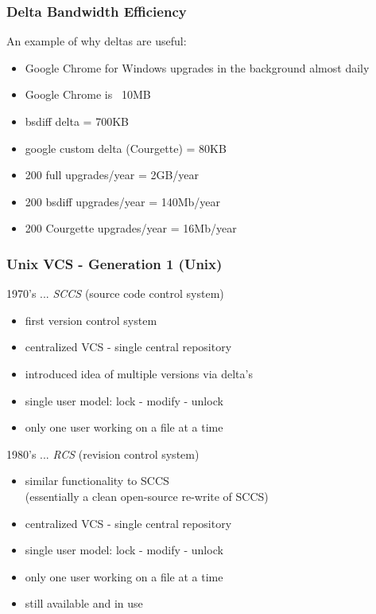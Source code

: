 \begin{frame}
\frametitle{Delta Bandwidth Efficiency}
An example of why deltas are useful:
{\small 
\begin{itemize}
\item  Google Chrome for Windows upgrades in the background almost daily
\item  Google Chrome is ~10MB
\item  bsdiff delta = 700KB
\item  google custom delta (Courgette) = 80KB
\item  200 full upgrades/year = 2GB/year
\item  200 bsdiff upgrades/year = 140Mb/year
\item  200 Courgette upgrades/year = 16Mb/year
\end{itemize}
}
\end{frame}

\begin{frame}
\frametitle{Unix VCS - Generation 1 (Unix)}
1970's ... {\em{SCCS}} (source code control system)
\begin{itemize}
\item  first version control system
\item  centralized VCS - single central repository
\item  introduced idea of multiple versions via delta's
\item  single user model: lock - modify - unlock
\item  only one user working on a file at a time 
\end{itemize}

1980's ... {\em{RCS}} (revision control system)
\begin{itemize}
\item  similar functionality to SCCS \\
    {\small (essentially a clean open-source re-write of SCCS)}
\item  centralized VCS - single central repository
\item  single user model: lock - modify - unlock
\item  only one user working on a file at a time 
\item  still available and in use 
\end{itemize}
\end{frame}


